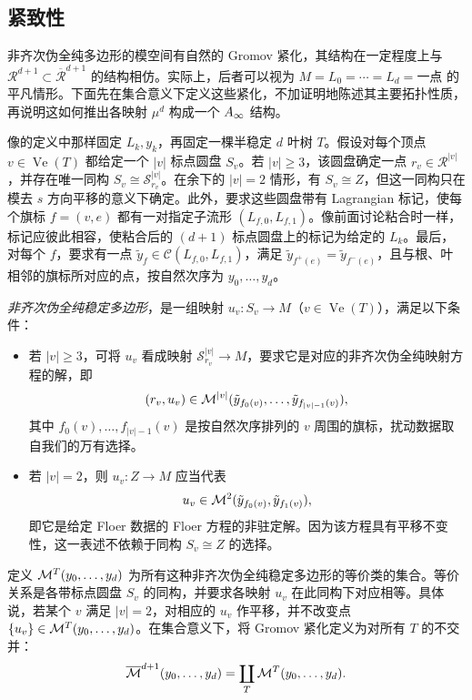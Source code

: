 \clearpage
\subsection{紧致性}\label{sec:9l}
非齐次伪全纯多边形的模空间有自然的 Gromov 紧化，其结构在一定程度上与 $\mathcal R^{d+1}\subset\overline{\mathcal R}^{d+1}$ 的结构相仿。实际上，后者可以视为
$M=L_0=\cdots=L_d=\text{一点}$ 的平凡情形。下面先在集合意义下定义这些紧化，不加证明地陈述其主要拓扑性质，再说明这如何推出各映射 $\mu^d$ 构成一个 $A_\infty$ 结构。

像的定义中那样固定 $L_k,y_k$，再固定一棵半稳定 $d$ 叶树 $T$。假设对每个顶点 $v\in\operatorname{Ve}(T)$ 都给定一个 $|v|$ 标点圆盘 $S_v$。若 $|v|\geq3$，该圆盘确定一点 $r_v\in\mathcal R^{|v|}$，并存在唯一同构 $S_v\cong\mathcal S_{r_v}^{|v|}$。在余下的 $|v|=2$ 情形，有 $S_v\cong Z$，但这一同构只在模去 $s$ 方向平移的意义下确定。此外，要求这些圆盘带有 Lagrangian 标记，使每个旗标 $f=(v,e)$ 都有一对指定子流形 $(L_{f,0},L_{f,1})$。像前面讨论粘合时一样，标记应彼此相容，使粘合后的 $(d+1)$ 标点圆盘上的标记为给定的 $L_k$。最后，对每个 $f$，要求有一点 $\tilde y_f\in\mathcal C(L_{f,0},L_{f,1})$，满足 $\tilde y_{f^+(e)}=\tilde y_{f^-(e)}$，且与根、叶相邻的旗标所对应的点，按自然次序为 $y_0,\ldots,y_d$。
\begin{definition*}
\emph{非齐次伪全纯稳定多边形}，是一组映射 $u_v:S_v\to M$（$v\in\operatorname{Ve}(T)$），满足以下条件：
\begin{itemize}
\item 若 $|v|\geq3$，可将 $u_v$ 看成映射 $\mathcal S_{r_v}^{|v|}\to M$，要求它是对应的非齐次伪全纯映射方程的解，即
\[
(r_v,u_v)\in\mathcal M^{|v|}(\tilde y_{f_0(v)},\ldots,\tilde y_{f_{|v|-1}(v)}),
\]
其中 $f_0(v),\ldots,f_{|v|-1}(v)$ 是按自然次序排列的 $v$ 周围的旗标，扰动数据取自我们的万有选择。
\item 若 $|v|=2$，则 $u_v:Z\to M$ 应当代表
\[
u_v\in\mathcal M^2(\tilde y_{f_0(v)},\tilde y_{f_1(v)}),
\]
即它是给定 Floer 数据的 Floer 方程的非驻定解。因为该方程具有平移不变性，这一表述不依赖于同构 $S_v\cong Z$ 的选择。
\end{itemize}
\end{definition*}
定义 $\mathcal M^T(y_0,\ldots,y_d)$ 为所有这种非齐次伪全纯稳定多边形的等价类的集合。等价关系是各带标点圆盘 $S_v$ 的同构，并要求各映射 $u_v$ 在此同构下对应相等。具体说，若某个 $v$ 满足 $|v|=2$，对相应的 $u_v$ 作平移，并不改变点 $\{u_v\}\in\mathcal M^T(y_0,\ldots,y_d)$。在集合意义下，将 Gromov 紧化定义为对所有 $T$ 的不交并：
\begin{equation}\label{eq:9.28}
\overline{\mathcal M}^{d+1}(y_0,\ldots,y_d)=\coprod_T\mathcal M^T(y_0,\ldots,y_d).
\end{equation}
